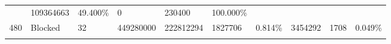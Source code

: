 \documentclass[11pt]{article}
\begin{document}
\begin{longtable}[]{@{}llllllllll@{}}
\begin{minipage}[t]{0.06\columnwidth}
\end{minipage} & \begin{minipage}[t]{0.07\columnwidth}\raggedright\strut
109364663\strut
\end{minipage} & \begin{minipage}[t]{0.07\columnwidth}\raggedright\strut
49.400\%\strut
\end{minipage} & \begin{minipage}[t]{0.06\columnwidth}\raggedright\strut
0\strut
\end{minipage} & \begin{minipage}[t]{0.07\columnwidth}\raggedright\strut
230400\strut
\end{minipage} & \begin{minipage}[t]{0.07\columnwidth}\raggedright\strut
100.000\%\strut
\end{minipage}\tabularnewline
\begin{minipage}[t]{0.09\columnwidth}\raggedright\strut
480\strut
\end{minipage} & \begin{minipage}[t]{0.06\columnwidth}\raggedright\strut
Blocked\strut
\end{minipage} & \begin{minipage}[t]{0.09\columnwidth}\raggedright\strut
32\strut
\end{minipage} & \begin{minipage}[t]{0.07\columnwidth}\raggedright\strut
449280000\strut
\end{minipage} & \begin{minipage}[t]{0.06\columnwidth}\raggedright\strut
222812294\strut
\end{minipage} & \begin{minipage}[t]{0.07\columnwidth}\raggedright\strut
1827706\strut
\end{minipage} & \begin{minipage}[t]{0.07\columnwidth}\raggedright\strut
0.814\%\strut
\end{minipage} & \begin{minipage}[t]{0.06\columnwidth}\raggedright\strut
3454292\strut
\end{minipage} & \begin{minipage}[t]{0.07\columnwidth}\raggedright\strut
1708\strut
\end{minipage} & \begin{minipage}[t]{0.07\columnwidth}\raggedright\strut
0.049\%\strut
\end{minipage}\tabularnewline
\begin{minipage}[t]{0.09\columnwidth}\raggedright\strut

\end{minipage}
\end{longtable}
\end{document}
